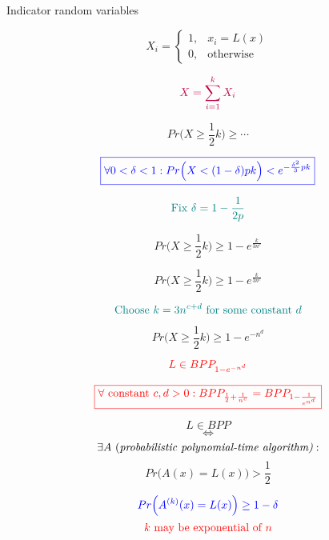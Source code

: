 \begin{frame}
  \centerline{Indicator random variables} 
  \[
	X_i = \begin{cases}
	  1, & x_i = L(x) \\
	  0, & \text{otherwise}
	\end{cases}
  \]

  \pause
  \[
	\textcolor{purple}{X = \sum_{i=1}^{k} X_i}
  \]

  \pause
  \[
	Pr\Big(X \ge \frac{1}{2} k \Big) \ge \cdots
  \]

  \pause
  \[
	\textcolor{blue}{\boxed{\forall 0 < \delta < 1: Pr\Big(X < (1-\delta)pk\Big) < e^{-\frac{\delta^2}{3}pk}}}
  \]

  \pause
  \[
	\textcolor{teal}{\text{Fix } \delta = 1 - \frac{1}{2p}}
  \]

  \pause
  \[
	Pr\Big(X \ge \frac{1}{2} k \Big) \ge 1 - e^{\frac{k}{3n^c}}
  \]
\end{frame}
\begin{frame}
  \[
	Pr\Big(X \ge \frac{1}{2} k \Big) \ge 1 - e^{\frac{k}{3n^c}}
  \]

  \pause
  \[
	\textcolor{teal}{\text{Choose } k = 3n^{c+d} \text{ for some constant } d}
  \]

  \pause
  \[
	Pr\Big(X \ge \frac{1}{2} k \Big) \ge 1 - e^{-n^{d}}
  \]

  \pause
  \[
	\textcolor{red}{L \in BPP_{1 - e^{-n^d}}}
  \]

  \pause
  \[
	\textcolor{red}{\boxed{\forall \text{ constant } c, d > 0: BPP_{\frac{1}{2} + \frac{1}{n^c}} = BPP_{1-\frac{1}{e^{n^d}}}}}
  \]
\end{frame}

\begin{frame}
  \begin{definition}
	\[
	  L \in BPP
	\]
	\[
	  \iff
	\]
	\[
	  \exists A \text{ (\it probabilistic polynomial-time algorithm)}: 
	\]
	\[
	  Pr\Big(A(x) = L(x)\Big) > \frac{1}{2}
	\]
  \end{definition}

  \pause
  \[
	\textcolor{blue}{Pr\Big(A^{(k)}(x) = L(x)\Big) \ge 1 - \delta}
  \]
  \[
	\textcolor{red}{k \text{ may be exponential of } n}
  \]
\end{frame}
